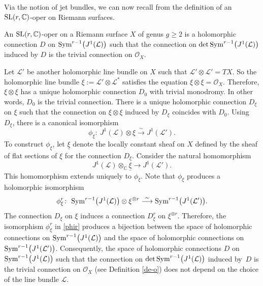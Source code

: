 \documentclass[10pt,a4paper]{amsart}
\numberwithin{equation}{section}
\begin{document}
Via the notion of jet bundles, we can now recall from
\cite{BD} the definition of an ${\rm SL}(r, {\mathbb C})$-oper on Riemann surfaces.

\begin{Definition}\label{de-o}
An ${\rm SL}(r, {\mathbb C})$-oper on a Riemann surface $X$ of genus
$g \geq 2$ is a holomorphic connection $D$ on
${\rm Sym}^{r-1}\bigl(J^1(\mathcal L)\bigr)$ such that the connection on $\det {\rm
Sym}^{r-1}\bigl(J^1(\mathcal L)\bigr)$ induced by $D$ is the trivial connection on ${\mathcal O}_X$.
\end{Definition}

\begin{Remark}\label{rem-th}
Let ${\mathcal L}'$ be another holomorphic line bundle on $X$ such that
${\mathcal L}'\otimes{\mathcal L}' = TX$. So the holomorphic line bundle $\xi := {\mathcal L}'\otimes {\mathcal L}^*$
satisfies the equation $\xi\otimes\xi = {\mathcal O}_X$. Therefore, $\xi\otimes\xi$ has a unique holomorphic connection
$D_0$ with trivial monodromy. In other words, $D_0$ is the trivial connection. There is a unique holomorphic connection $D_\xi$
on $\xi$ such that the connection on $\xi\otimes\xi$ induced by $D_\xi$ coincides with $D_0$. Using $D_\xi$, there is a canonical
isomorphism
\[
\phi_\xi\colon\ J^1({\mathcal L})\otimes\xi \stackrel{\sim}{\longrightarrow} J^1({\mathcal L}').
\]
To construct $\phi_\xi$, let $\underline{\xi}$ denote the locally constant sheaf on $X$ defined by the sheaf of flat sections of
$\xi$ for the connection $D_\xi$. Consider the natural homomorphism
\[
J^1({\mathcal L})\otimes_{\mathbb C}\underline{\xi} \longrightarrow J^1({\mathcal L}').
\]
This homomorphism extends uniquely to $\phi_\xi$. Note that $\phi_\xi$ produces a holomorphic isomorphism
\begin{gather}\label{phir}
\phi^r_\xi\colon\ {\rm Sym}^{r-1}\bigl(J^1({\mathcal L})\bigr)\otimes \xi^{\otimes r}
 \stackrel{\sim}{\longrightarrow} {\rm Sym}^{r-1}\bigl(J^1({\mathcal L}')\bigr).
\end{gather}
The connection $D_\xi$ on $\xi$ induces a connection $D^r_\xi$ on $\xi^{\otimes r}$. Therefore, the isomorphism $\phi^r_\xi$ in
\eqref{phir} produces a bijection between the space of holomorphic connections on ${\rm Sym}^{r-1}\bigl(J^1({\mathcal L})\bigr)$
and the space of holomorphic connections on ${\rm Sym}^{r-1}\bigl(J^1({\mathcal L}')\bigr)$. Consequently,
the space of holomorphic connections $D$ on ${\rm Sym}^{r-1}\bigl(J^1(\mathcal L)\bigr)$ such that the connection on $\det {\rm
Sym}^{r-1}\bigl(J^1(\mathcal L)\bigr)$ induced by~$D$ is the trivial connection on ${\mathcal O}_X$
(see Definition \ref{de-o}) does not depend on the choice of the line bundle $\mathcal L$.
\end{Remark}
\end{document}
